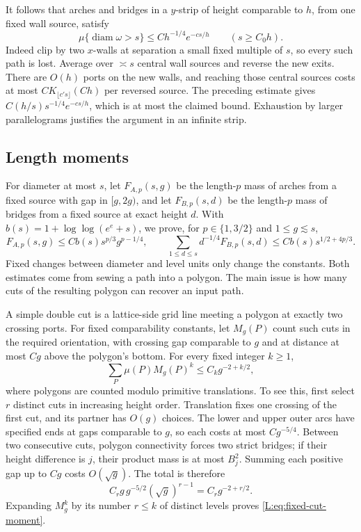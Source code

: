 It follows that arches and bridges in a $y$-strip of height comparable
to $h$, from one fixed wall source, satisfy
\[
 \mu\{\operatorname{diam}\omega>s\}
 \le C h^{-1/4}e^{-cs/h}\qquad(s\ge C_0h).
\]
Indeed clip by two $x$-walls at separation a small fixed multiple of
$s$, so every such path is lost.  Average over $\asymp s$ central
wall sources and reverse the new exits.  There are $O(h)$ ports on
the new walls, and reaching those central sources costs at most
$C K_{\lfloor c's\rfloor}(Ch)$ per reversed source.  The preceding
estimate gives $C(h/s)s^{-1/4}e^{-cs/h}$, which is at most the claimed
bound.  Exhaustion by larger parallelograms justifies the argument in
an infinite strip.

\subsection{Length moments}\label{L:step19}\label{L:prop:moments}

For diameter at most $s$, let $F_{A,p}(s,g)$ be the length-$p$ mass of
arches from a fixed source with gap in $[g,2g)$, and let
$F_{B,p}(s,d)$ be the length-$p$ mass of bridges from a fixed source
at exact height $d$.  With $b(s)=1+\log\log(e^e+s)$, we prove, for
$p\in\{1,3/2\}$ and $1\le g\lesssim s$,
\begin{equation}\label{L:eq:geometric-moments}
 F_{A,p}(s,g)\le Cb(s)s^{p/3}g^{p-1/4},\qquad
 \sum_{1\le d\le s}d^{-1/4}F_{B,p}(s,d)
 \le Cb(s)s^{1/2+4p/3}.
\end{equation}
Fixed changes between diameter and level units only change the constants.
Both estimates come from sewing a path into a polygon.  The main issue
is how many cuts of the resulting polygon can recover an input path.

A simple double cut is a lattice-side grid line meeting a polygon at
exactly two crossing ports.  For fixed comparability constants, let
$M_g(P)$ count such cuts in the required orientation, with crossing
gap comparable to $g$ and at distance at most $Cg$ above the polygon's
bottom.  For every fixed integer $k\ge1$,
\begin{equation}\label{L:eq:fixed-cut-moment}
 \sum_P\mu(P)M_g(P)^k\le C_k g^{-2+k/2},
\end{equation}
where polygons are counted modulo primitive translations.  To see
this, first select $r$ distinct cuts in increasing height order.
Translation fixes one crossing of the first cut, and its partner has
$O(g)$ choices.  The lower and upper outer arcs have specified ends
at gaps comparable to $g$, so each costs at most $Cg^{-5/4}$.
Between two consecutive cuts, polygon connectivity forces two strict
bridges; if their height difference is $j$, their product mass is at
most $B_j^2$.  Summing each positive gap up to $Cg$ costs $O(\sqrt g)$.
The total is therefore
\[
 C_r g\,g^{-5/2}(\sqrt g)^{r-1}=C_r g^{-2+r/2}.
\]
Expanding $M_g^k$ by its number $r\le k$ of distinct levels proves
\eqref{L:eq:fixed-cut-moment}.


